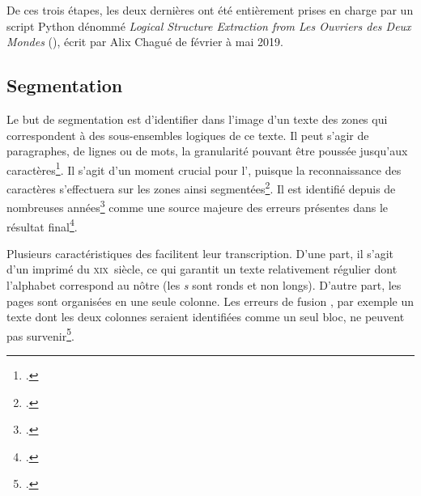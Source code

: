 De ces trois étapes, les deux dernières ont été entièrement prises en charge par un script Python dénommé \textit{Logical Structure Extraction from Les Ouvriers des Deux Mondes} (\lse), écrit par Alix Chagué de février à mai 2019.

\subsection{Segmentation}

Le but de segmentation est d'identifier dans l'image d'un texte des zones qui correspondent à des sous-ensembles logiques de ce texte. Il peut s'agir de paragraphes, de lignes ou de mots, la granularité pouvant être poussée jusqu'aux caractères\footcite[p. 3]{karpinski}. Il s'agit d'un moment crucial pour l'\ocr, puisque la reconnaissance des caractères s'effectuera sur les zones ainsi segmentées\footcite[p. 3]{casey}. Il est identifié depuis de nombreuses années\footcite[p. 4]{casey} comme une source majeure des erreurs présentes dans le résultat final\footcite[p. 120]{elagouni}.

Plusieurs caractéristiques des \odm{} facilitent leur transcription. D'une part, il s'agit d'un imprimé du \textsc{xix}\ieme ~siècle, ce qui garantit un texte relativement régulier dont l'alphabet correspond au nôtre (les \textit{s} sont ronds et non longs). D'autre part, les pages sont organisées en une seule colonne. Les erreurs \og de fusion \fg{}, par exemple un texte dont les deux colonnes seraient identifiées comme un seul bloc, ne peuvent pas survenir\footcite[p. 5]{karpinski}.

